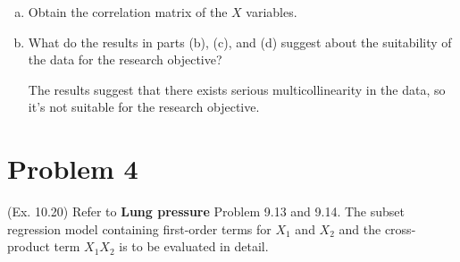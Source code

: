 \documentclass[10pt]{report}
\begin{document}
\begin{enumerate}[a.]
	\item 
	Obtain the correlation matrix of the $X$ variables.
	
	
	\item 
	What do the results in parts (b), (c), and (d) suggest about the suitability of the data for the research objective?
	
	The results suggest that there exists serious multicollinearity in the data, so it's not suitable for the research objective.
\end{enumerate}

\section*{Problem 4}
(Ex. 10.20) Refer to \textbf{Lung pressure} Problem 9.13 and 9.14. The subset regression model containing first-order terms for $X_1$ and $X_2$ and the cross-product term $X_1 X_2$ is to be evaluated in detail.
\end{document}
